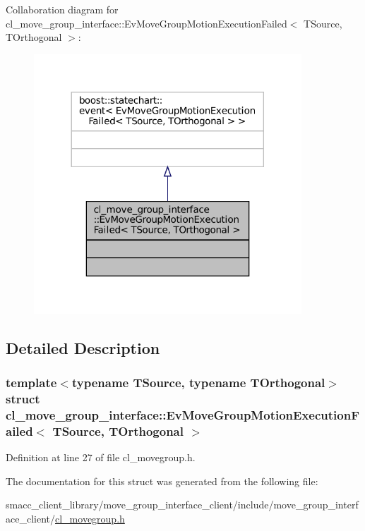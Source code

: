 Collaboration diagram for cl\+\_\+move\+\_\+group\+\_\+interface\+:\+:Ev\+Move\+Group\+Motion\+Execution\+Failed$<$ T\+Source, T\+Orthogonal $>$\+:
\nopagebreak
\begin{figure}[H]
\begin{center}
\leavevmode
\includegraphics[width=284pt]{structcl__move__group__interface_1_1EvMoveGroupMotionExecutionFailed__coll__graph}
\end{center}
\end{figure}


\subsection{Detailed Description}
\subsubsection*{template$<$typename T\+Source, typename T\+Orthogonal$>$\newline
struct cl\+\_\+move\+\_\+group\+\_\+interface\+::\+Ev\+Move\+Group\+Motion\+Execution\+Failed$<$ T\+Source, T\+Orthogonal $>$}



Definition at line 27 of file cl\+\_\+movegroup.\+h.



The documentation for this struct was generated from the following file\+:\begin{DoxyCompactItemize}
\item 
smacc\+\_\+client\+\_\+library/move\+\_\+group\+\_\+interface\+\_\+client/include/move\+\_\+group\+\_\+interface\+\_\+client/\hyperlink{cl__movegroup_8h}{cl\+\_\+movegroup.\+h}\end{DoxyCompactItemize}

